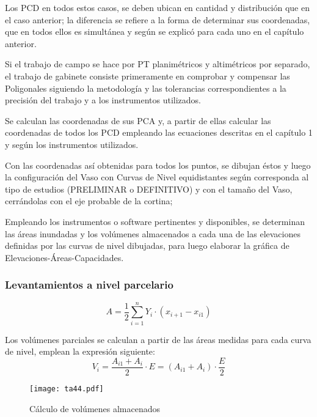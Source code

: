 Los PCD en todos estos casos, se deben ubican en cantidad y distribución que en el caso anterior; la diferencia se refiere a la forma de determinar sus coordenadas, que en todos ellos es simultánea y según se explicó para cada uno en el capítulo anterior.

Si el trabajo de campo se hace por PT planimétricos y altimétricos por separado, el trabajo de gabinete consiste primeramente en comprobar y compensar las Poligonales siguiendo la metodología y las tolerancias correspondientes a la precisión del trabajo y a los instrumentos utilizados.

Se calculan las coordenadas de sus PCA y, a partir de ellas calcular las coordenadas de todos los PCD empleando las ecuaciones descritas en el capítulo 1 y según los instrumentos utilizados.

Con las coordenadas así obtenidas para todos los puntos, se dibujan éstos y luego la configuración del Vaso con Curvas de Nivel equidistantes según corresponda al tipo de estudios (PRELIMINAR o DEFINITIVO) y con el tamaño del Vaso, cerrándolas con el eje probable de la cortina;

Empleando los instrumentos o software pertinentes y disponibles, se determinan las áreas inundadas y los volúmenes almacenados a cada una de las elevaciones definidas por las curvas de nivel dibujadas, para luego elaborar la gráfica de Elevaciones-Áreas-Capacidades.

\subsubsection{Levantamientos a nivel parcelario}

\begin{equation}
    A = \frac{1}{2} \sum_{i = 1}^n Y_i\cdot\left(x_{i + 1} - x_{i 1}\right)
\end{equation}

Los volúmenes parciales se calculan a partir de las áreas medidas para cada curva de nivel, emplean la expresión siguiente:
\begin{equation}
    V_i = \frac{A_{i 1} + A_i}{2}\cdot E =\left(A_{i 1} + A_i\right)\cdot \frac{E}{2}
\end{equation}

\begin{figure}[h!]
\centering
  \texttt{[image: ta44.pdf]}
  \caption{Cálculo de volúmenes almacenados}
  \label{ta44}
\end{figure}

